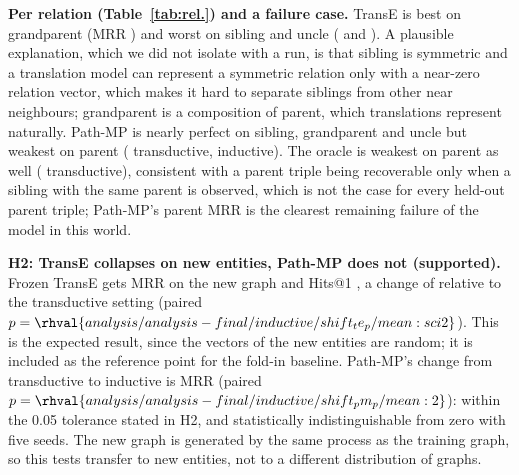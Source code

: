 \vspace{4pt}\noindent\textbf{Per relation (Table~\ref{tab:rel.}) and a failure case.} TransE is best on grandparent (MRR ) and worst on sibling and uncle ( and ). A plausible explanation, which we did not isolate with a run, is that sibling is symmetric and a translation model can represent a symmetric relation only with a near-zero relation vector, which makes it hard to separate siblings from other near neighbours; grandparent is a composition of parent, which translations represent naturally. Path-MP is nearly perfect on sibling, grandparent and uncle but weakest on parent ( transductive,  inductive). The oracle is weakest on parent as well ( transductive), consistent with a parent triple being recoverable only when a sibling with the same parent is observed, which is not the case for every held-out parent triple; Path-MP's parent MRR is the clearest remaining failure of the model in this world.

\vspace{4pt}\noindent\textbf{H2: TransE collapses on new entities, Path-MP does not (supported).} Frozen TransE gets MRR  on the new graph and Hits@1 , a change of  relative to the transductive setting (paired $p=\rhval{analysis/analysis-final/inductive/shift_te_p/mean:sci2}$). This is the expected result, since the vectors of the new entities are random; it is included as the reference point for the fold-in baseline. Path-MP's change from transductive to inductive is  MRR (paired $p=\rhval{analysis/analysis-final/inductive/shift_pm_p/mean:2}$): within the 0.05 tolerance stated in H2, and statistically indistinguishable from zero with five seeds. The new graph is generated by the same process as the training graph, so this tests transfer to new entities, not to a different distribution of graphs.

